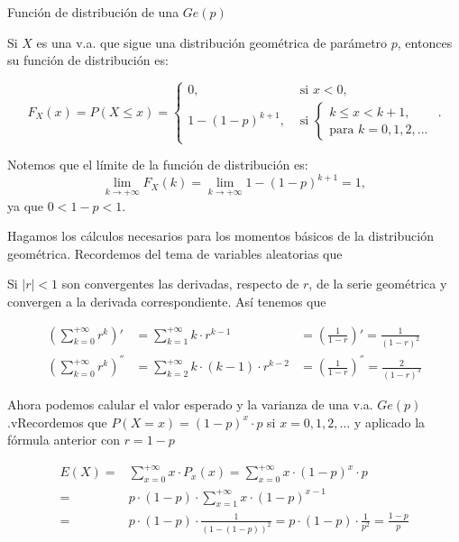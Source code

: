 \documentclass[
  letterpaper,
  DIV=11,
  numbers=noendperiod]{scrreprt}
\begin{document}
\begin{Proposicion}{Función de distribución de una \(Ge(p)\)}{}

Si \(X\) es una v.a. que sigue una distribución geométrica de parámetro
\(p\), entonces su función de distribución es:

\[
F_X(x)=P(X\leq x)=
\left\{\begin{array}{ll} 
0, & \mbox{ si } x<0,\\
1- (1-p)^{k+1}, & \mbox{ si } \left\{ \begin{array}{l}k\leq x< k+1,\\\mbox{para } k=0,1,2,\ldots\end{array}
\right.
\end{array}
\right..
\]

Notemos que el límite de la función de distribución es: \[
\displaystyle\lim_{k\to +\infty } F_X(k)=\lim_{k\to +\infty } 1-(1-p)^{k+1}=
1,
\] ya que \(0<1-p<1\).

\end{Proposicion}

Hagamos los cálculos necesarios para los momentos básicos de la
distribución geométrica. Recordemos del tema de variables aleatorias que

Si \(|r|<1\) son convergentes las derivadas, respecto de \(r\), de la
serie geométrica y convergen a la derivada correspondiente. Así tenemos
que

\[
\begin{array}{rlrl}
\left(\sum_{k=0}^{+\infty} r^k\right)'&= \sum_{k=1}^{+\infty}k\cdot
r^{k-1} &= \left(\frac1{1-r}\right)'=\frac1{(1-r)^2}\\
\left(\sum_{k=0}^{+\infty} r^k\right)^{''}&= \sum_{k=2}^{+\infty}k \cdot(k-1)\cdot
r^{k-2}&=\left(\frac1{1-r}\right)^{''}=\frac2{(1-r)^3}
\end{array}
\]

Ahora podemos calular el valor esperado y la varianza de una v.a.
\(Ge(p)\).vRecordemos que \(P(X=x)=(1-p)^x\cdot p\) si
\(x=0,1,2,\ldots\) y aplicado la fórmula anterior con \(r=1-p\)

\begin{align*}
E(X)=&\sum_{x=0}^{+\infty} x\cdot P_x(x)=\sum_{x=0}^{+\infty} x\cdot (1-p)^x\cdot p\\
=& p\cdot (1-p) \cdot \sum_{x=1}^{+\infty} x\cdot (1-p)^{x-1}\\
=& p\cdot (1-p)\cdot \frac{1}{(1-(1-p))^2}=p\cdot (1-p)\cdot \frac{1}{p^2}=\frac{1-p}{p}
\end{align*}
\end{document}
